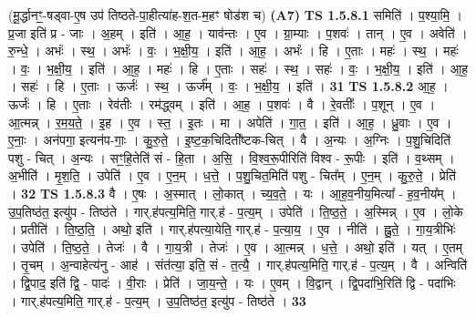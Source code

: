 \documentclass[17pt]{extarticle}
\begin{document}
                  \newline
                      (मू॒र्द्धानꣳ॒॒-षड्वा-ए॒ष उप॑ तिष्ठते-पा॒हीत्या॑ह-श॒त-म॒हꣳ षोड॑श च)  \textbf{(A7)} \newline \newline
                                \textbf{ TS 1.5.8.1} \newline
                  समिति॑ । प॒श्या॒मि॒ । प्र॒जा इति॑ प्र - जाः । अ॒हम् । इति॑ । आ॒ह॒ । याव॑न्तः । ए॒व । ग्रा॒म्याः । प॒शवः॑ । तान् । ए॒व । अवेति॑ । रु॒न्धे॒ । अभंः॑ । स्थ॒ । अभंः॑ । वः॒ । भ॒क्षी॒य॒ । इति॑ । आ॒ह॒ । अभंः॑ । हि । ए॒ताः । महः॑ । स्थ॒ । महः॑ । वः॒ । भ॒क्षी॒य॒ । इति॑ । आ॒ह॒ । महः॑ । हि । ए॒ताः । सहः॑ । स्थ॒ । सहः॑ । वः॒ । भ॒क्षी॒य॒ । इति॑ । आ॒ह॒ । सहः॑ । हि । ए॒ताः । ऊर्जः॑ । स्थ॒ । ऊर्ज᳚म् । वः॒ । भ॒क्षी॒य॒ । इति॑ । \textbf{  31} \newline
                  \newline
                                \textbf{ TS 1.5.8.2} \newline
                  आ॒ह॒ । ऊर्जः॑ । हि । ए॒ताः । रेव॑तीः । रम॑द्ध्वम् । इति॑ । आ॒ह॒ । प॒शवः॑ । वै । रे॒वतीः᳚ । प॒शून् । ए॒व । आ॒त्मन्न् । र॒म॒य॒ते॒ । इ॒ह । ए॒व । स्त॒ । इ॒तः । मा । अपेति॑ । गा॒त॒ । इति॑ । आ॒ह॒ । ध्रु॒वाः । ए॒व । ए॒नाः॒ । अन॑पगा॒ इत्यन॑प-गाः॒ । कु॒रु॒ते॒ । इ॒ष्ट॒क॒चिदिती᳚ष्टक-चित् । वै । अ॒न्यः । अ॒ग्निः । प॒शु॒चिदिति॑ पशु - चित् । अ॒न्यः । सꣳ॒॒हि॒तेति॑ सं - हि॒ता । अ॒सि॒ । वि॒श्व॒रू॒पीरिति॑ विश्व - रू॒पीः । इति॑ । व॒थ्सम् । अ॒भीति॑ । मृ॒श॒ति॒ । उपेति॑ । ए॒व । ए॒न॒म् । ध॒त्ते॒ । प॒शु॒चित॒मिति॑ पशु - चित᳚म् । ए॒न॒म् । कु॒रु॒ते॒ । प्रेति॑ । \textbf{  32} \newline
                  \newline
                                \textbf{ TS 1.5.8.3} \newline
                  वै । ए॒षः । अ॒स्मात् । लो॒कात् । च्य॒व॒ते॒ । यः । आ॒ह॒व॒नीय॒मित्या᳚ - ह॒व॒नीय᳚म् । उ॒प॒तिष्ठ॑त॒ इत्यु॑प - तिष्ठ॑ते । गार्.ह॑पत्य॒मिति॒ गार्.ह॑ - प॒त्य॒म् । उपेति॑ । ति॒ष्ठ॒ते॒ । अ॒स्मिन्न् । ए॒व । लो॒के । प्रतीति॑ । ति॒ष्ठ॒ति॒ । अथो॒ इति॑ । गार्.ह॑पत्या॒येति॒ गार्.ह॑ - प॒त्या॒य॒ । ए॒व । नीति॑ । ह्नु॒ते॒ । गा॒य॒त्रीभिः॑ । उपेति॑ । ति॒ष्ठ॒ते॒ । तेजः॑ । वै । गा॒य॒त्री । तेजः॑ । ए॒व । आ॒त्मन्न् । ध॒त्ते॒ । अथो॒ इति॑ । यत् । ए॒तम् । तृ॒चम् । अ॒न्वाहेत्य॑नु - आह॑ । संत॑त्या॒ इति॒ सं - त॒त्यै॒ । गार्.ह॑पत्य॒मिति॒ गार्.ह॑ - प॒त्य॒म् । वै । अन्विति॑ । द्वि॒पाद॒ इति॑ द्वि॒ - पादः॑ । वी॒राः । प्रेति॑ । जा॒य॒न्ते॒ । यः । ए॒वम् । वि॒द्वान् । द्वि॒पदा॑भि॒रिति॑ द्वि - पदा॑भिः । गार्.ह॑पत्य॒मिति॒ गार्.ह॑ - प॒त्य॒म् । उ॒प॒तिष्ठ॑त॒ इत्यु॑प - तिष्ठ॑ते । \textbf{  33} \newline
\end{document}
